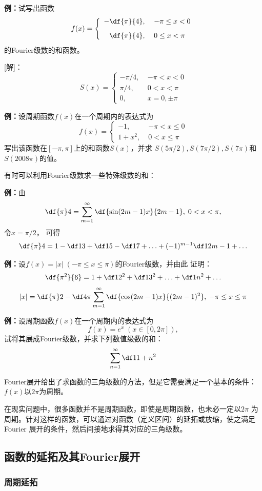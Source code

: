 {\bf 例：}试写出函数
$$f(x)=\left\{\begin{array}{rl}
	-\df{\pi}{4},\; & -\pi\leq x<0\\[8pt]
	\df{\pi}{4},\; & 0\leq x<\pi
\end{array}\right.$$
的Fourier级数的和函数。

[解]：
$${S(x)=\left\{\begin{array}{ll}
	-\pi/4,\;& -\pi<x<0\\
	\pi/4,\;& 0<x<\pi\\
	0,\; & x=0,\pm\pi
\end{array}\right.}$$
\fin

{\bf 例：}设周期函数$f(x)$在一个周期内的表达式为
$$f(x)=\left\{\begin{array}{ll}
	-1,\;& -\pi<x\leq 0\\
	1+x^2,\; & 0<x\leq\pi
\end{array}\right.$$
写出该函数在$[-\pi,\pi]$上的和函数$S(x)$，并求
$S(5\pi/2),S(7\pi/2),S(7\pi)$和$S(2008\pi)$的值。

有时可以利用Fourier级数求一些特殊级数的和：

{\bf 例：}由
$$\df{\pi}4=\sum\limits_{m=1}^{\infty}
\df{\sin(2m-1)x}{2m-1},\;0<x<\pi,$$
 令$x=\pi/2$， 可得
$$\df{\pi}4=1-\df 13+\df 15-\df 17+\ldots
+(-1)^{m-1}\df 1{2m-1}+\ldots$$

{\bf 例：}设$f(x)=|x|\;(-\pi\leq x\leq \pi)$的Fourier级数，并由此
证明：
$$\df{\pi^2}{6}=1+\df 1{2^2}+\df 1{3^2}+\ldots+\df 1{n^2}+\ldots$$
$${|x|=\df{\pi}2-\df 4{\pi}\sum\limits_{m=1}^{\infty} 
\df{\cos(2m-1)x}{(2m-1)^2},\;-\pi\leq x\leq \pi}$$

{\bf 例：}设周期函数$f(x)$在一个周期内的表达式为
$$f(x)=e^x\;(x\in[0,2\pi]),$$
试将其展成Fourier级数，并求下列数值级数的和：
$$\sum\limits_{n=1}^{\infty}\df1{1+n^2}$$

Fourier展开给出了求函数的三角级数的方法，但是它需要满足一个基本的条件：
$f(x)$以$2\pi$为周期。

在现实问题中，很多函数并不是周期函数，即使是周期函数，也未必一定以$2\pi$
为周期。针对这样的函数，可以通过对函数（定义区间）的延拓或放缩，使之满足Fourier
展开的条件，然后间接地求得其对应的三角级数。

\subsection{函数的延拓及其Fourier展开}

\subsubsection{周期延拓}


